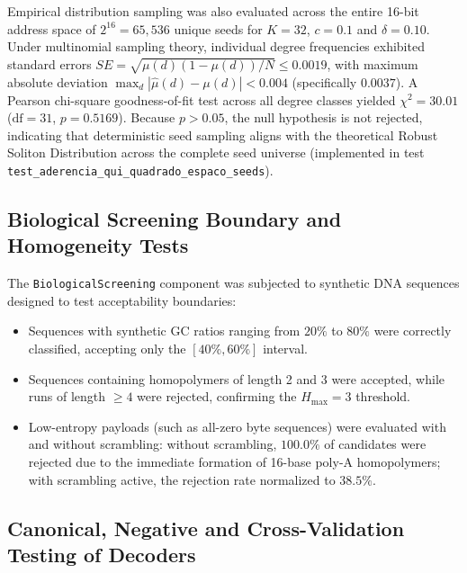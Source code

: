Empirical distribution sampling was also evaluated across the entire 16-bit address space of $2^{16} = 65{,}536$ unique seeds for $K = 32$, $c = 0.1$ and $\delta = 0.10$. Under multinomial sampling theory, individual degree frequencies exhibited standard errors $SE = \sqrt{\mu(d)(1-\mu(d))/N} \le 0.0019$, with maximum absolute deviation $\max_d |\hat{\mu}(d) - \mu(d)| < 0.004$ (specifically $0.0037$). A Pearson chi-square goodness-of-fit test across all degree classes yielded $\chi^2 = 30.01$ ($\text{df} = 31$, $p = 0.5169$). Because $p > 0.05$, the null hypothesis is not rejected, indicating that deterministic seed sampling aligns with the theoretical Robust Soliton Distribution across the complete seed universe (implemented in test \texttt{test\_aderencia\_qui\_quadrado\_espaco\_seeds}).

\subsection{Biological Screening Boundary and Homogeneity Tests}

The \texttt{BiologicalScreening} component was subjected to synthetic DNA sequences designed to test acceptability boundaries:
\begin{itemize}
    \item Sequences with synthetic GC ratios ranging from $20\%$ to $80\%$ were correctly classified, accepting only the $[40\%, 60\%]$ interval.
    \item Sequences containing homopolymers of length 2 and 3 were accepted, while runs of length $\ge 4$ were rejected, confirming the $H_{\max} = 3$ threshold.
    \item Low-entropy payloads (such as all-zero byte sequences) were evaluated with and without scrambling: without scrambling, $100.0\%$ of candidates were rejected due to the immediate formation of 16-base poly-A homopolymers; with scrambling active, the rejection rate normalized to $38.5\%$.
\end{itemize}

\subsection{Canonical, Negative and Cross-Validation Testing of Decoders}

